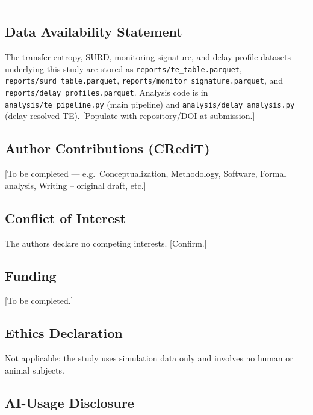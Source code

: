\documentclass[
  english,
  11pt,
]{article}
\begin{document}
\begin{center}\rule{0.5\linewidth}{0.5pt}\end{center}

\subsection{Data Availability
Statement}\label{data-availability-statement}

The transfer-entropy, SURD, monitoring-signature, and delay-profile
datasets underlying this study are stored as
\texttt{reports/te\_table.parquet},
\texttt{reports/surd\_table.parquet},
\texttt{reports/monitor\_signature.parquet}, and
\texttt{reports/delay\_profiles.parquet}. Analysis code is in
\texttt{analysis/te\_pipeline.py} (main pipeline) and
\texttt{analysis/delay\_analysis.py} (delay-resolved TE). {[}Populate
with repository/DOI at submission.{]}

\subsection{Author Contributions
(CRediT)}\label{author-contributions-credit}

{[}To be completed --- e.g.~Conceptualization, Methodology, Software,
Formal analysis, Writing -- original draft, etc.{]}

\subsection{Conflict of Interest}\label{conflict-of-interest}

The authors declare no competing interests. {[}Confirm.{]}

\subsection{Funding}\label{funding}

{[}To be completed.{]}

\subsection{Ethics Declaration}\label{ethics-declaration}

Not applicable; the study uses simulation data only and involves no
human or animal subjects.

\subsection{AI-Usage Disclosure}\label{ai-usage-disclosure}
\end{document}
